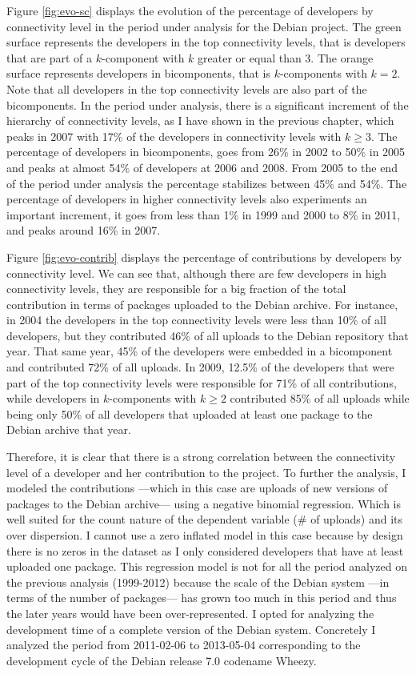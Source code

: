 Figure \ref{fig:evo-sc} displays the evolution of the percentage of developers by connectivity level in the period under analysis for the Debian project. The green surface represents the developers in the top connectivity levels, that is developers that are part of a $k$-component with $k$ greater or equal than 3. The orange surface represents developers in bicomponents, that is $k$-components with $k=2$. Note that all developers in the top connectivity levels are also part of the bicomponents. In the period under analysis, there is a significant increment of the hierarchy of connectivity levels, as I have shown in the previous chapter, which peaks in 2007 with 17\% of the developers in connectivity levels with $k \ge 3$. The percentage of developers in bicomponents, goes from 26\% in 2002 to 50\% in 2005 and peaks at almost 54\% of developers at 2006 and 2008. From 2005 to the end of the period under analysis the percentage stabilizes between 45\% and 54\%. The percentage of developers in higher connectivity levels also experiments an important increment, it goes from less than 1\% in 1999 and 2000 to 8\% in 2011, and peaks around 16\% in 2007.

Figure \ref{fig:evo-contrib} displays the percentage of contributions by developers by connectivity level. We can see that, although there are few developers in high connectivity levels, they are responsible for a big fraction of the total contribution in terms of packages uploaded to the Debian archive. For instance, in 2004 the developers in the top connectivity levels were less than 10\% of all developers, but they contributed 46\% of all uploads to the Debian repository that year. That same year, 45\% of the developers were embedded in a bicomponent and contributed 72\% of all uploads. In 2009, 12.5\% of the developers that were part of the top connectivity levels were responsible for 71\% of all contributions, while developers in $k$-components with $k \ge 2$ contributed 85\% of all uploads while being only 50\% of all developers that uploaded at least one package to the Debian archive that year. 

Therefore, it is clear that there is a strong correlation between the connectivity level of a developer and her contribution to the project. To further the analysis, I modeled the contributions ---which in this case are uploads of new versions of packages to the Debian archive--- using a negative binomial regression. Which is well suited for the count nature of the dependent variable (\# of uploads) and its over dispersion. I cannot use a zero inflated model in this case because by design there is no zeros in the dataset as I only considered developers that have at least uploaded one package. This regression model is not for all the period analyzed on the previous analysis (1999-2012) because the scale of the Debian system ---in terms of the number of packages--- has grown too much in this period and thus the later years would have been over-represented. I opted for analyzing the development time of a complete version of the Debian system. Concretely I analyzed the period from 2011-02-06 to 2013-05-04  corresponding to the development cycle of the Debian release 7.0 codename Wheezy.

